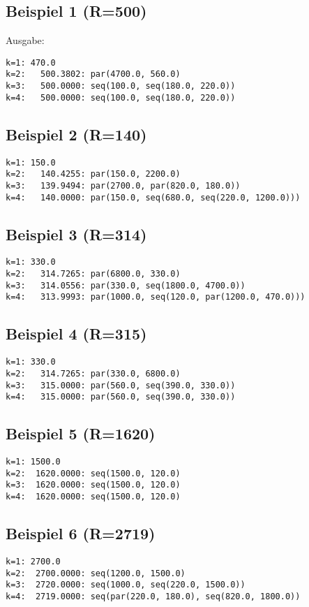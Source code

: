 \documentclass[a4paper,10pt,ngerman]{scrartcl}
\begin{document}
\subsection{Beispiel 1 (R=500)}
Ausgabe:
\begin{verbatim}
k=1: 470.0
k=2:   500.3802: par(4700.0, 560.0)
k=3:   500.0000: seq(100.0, seq(180.0, 220.0))
k=4:   500.0000: seq(100.0, seq(180.0, 220.0))
\end{verbatim}
\pagebreak
\subsection{Beispiel 2 (R=140)}
\begin{verbatim}
k=1: 150.0
k=2:   140.4255: par(150.0, 2200.0)
k=3:   139.9494: par(2700.0, par(820.0, 180.0))
k=4:   140.0000: par(150.0, seq(680.0, seq(220.0, 1200.0)))
\end{verbatim}
\pagebreak
\subsection{Beispiel 3 (R=314)}
\begin{verbatim}
k=1: 330.0
k=2:   314.7265: par(6800.0, 330.0)
k=3:   314.0556: par(330.0, seq(1800.0, 4700.0))
k=4:   313.9993: par(1000.0, seq(120.0, par(1200.0, 470.0)))
\end{verbatim}
\pagebreak
\subsection{Beispiel 4 (R=315)}
\begin{verbatim}
k=1: 330.0
k=2:   314.7265: par(330.0, 6800.0)
k=3:   315.0000: par(560.0, seq(390.0, 330.0))
k=4:   315.0000: par(560.0, seq(390.0, 330.0))
\end{verbatim}
\pagebreak
\subsection{Beispiel 5 (R=1620)}
\begin{verbatim}
k=1: 1500.0
k=2:  1620.0000: seq(1500.0, 120.0)
k=3:  1620.0000: seq(1500.0, 120.0)
k=4:  1620.0000: seq(1500.0, 120.0)
\end{verbatim}
\pagebreak
\subsection{Beispiel 6 (R=2719)}
\begin{verbatim}
k=1: 2700.0
k=2:  2700.0000: seq(1200.0, 1500.0)
k=3:  2720.0000: seq(1000.0, seq(220.0, 1500.0))
k=4:  2719.0000: seq(par(220.0, 180.0), seq(820.0, 1800.0))
\end{verbatim}
\pagebreak
\end{document}
